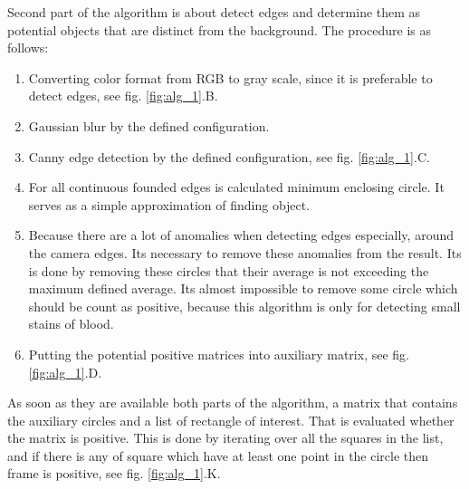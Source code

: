 \documentclass[twoside]{article}
\begin{document}
\begin{multicols}{2}
Second part of the algorithm is about detect edges and determine them as potential objects that are distinct from the background. The procedure is as follows:
\begin{enumerate}
	\item Converting color format from RGB to gray scale, since it is preferable to detect edges, see fig. \ref{fig:alg_1}.B.
	\item Gaussian blur by the defined configuration.
	\item Canny edge detection by the defined configuration, see fig. \ref{fig:alg_1}.C.
	\item For all continuous founded edges is calculated minimum enclosing circle. It serves as a simple approximation of finding object.
	\item Because there are a lot of anomalies when detecting edges especially, around the camera edges. Its necessary to remove these anomalies from the result. Its is done by removing these circles that their average is not exceeding the maximum defined average. Its almost impossible to remove some circle which should be count as positive, because this algorithm is only for detecting small stains of blood.
	\item Putting the potential positive matrices into auxiliary matrix, see fig. \ref{fig:alg_1}.D.
\end{enumerate}

As soon as they are available both parts of the algorithm, a matrix that contains the auxiliary circles and a list of rectangle of interest. That is evaluated whether the matrix is positive. This is done by iterating over all the squares in the list, and if there is any of square which have at least one point in the circle then frame is positive, see fig. \ref{fig:alg_1}.K.


\end{multicols}
\end{document}
